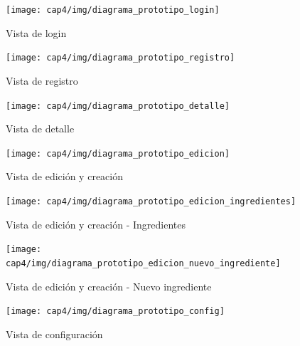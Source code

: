 \begin{figure}[hp]
  \centering
  \texttt{[image: cap4/img/diagrama\_prototipo\_login]}
  \caption{Vista de login}
  \label{fig:diagrama-prototipo-login}
\end{figure}

\begin{figure}[hp]
  \centering
  \texttt{[image: cap4/img/diagrama\_prototipo\_registro]}
  \caption{Vista de registro}
  \label{fig:diagrama-prototipo-registro}
\end{figure}

\begin{figure}[hp]
  \centering
  \texttt{[image: cap4/img/diagrama\_prototipo\_detalle]}
  \caption{Vista de detalle}
  \label{fig:diagrama-prototipo-detalle}
\end{figure}

\begin{figure}[hp]
  \centering
  \texttt{[image: cap4/img/diagrama\_prototipo\_edicion]}
  \caption{Vista de edición y creación}
  \label{fig:diagrama-prototipo-edicion}
\end{figure}

\begin{figure}[hp]
  \centering
  \texttt{[image: cap4/img/diagrama\_prototipo\_edicion\_ingredientes]}
  \caption{Vista de edición y creación - Ingredientes}
  \label{fig:diagrama-prototipo-edicion-ingredientes}
\end{figure}

\begin{figure}[hp]
  \centering
  \texttt{[image: cap4/img/diagrama\_prototipo\_edicion\_nuevo\_ingrediente]}
  \caption{Vista de edición y creación - Nuevo ingrediente}
  \label{fig:diagrama-prototipo-edicion-nuevo-ingrediente}
\end{figure}

\begin{figure}[hp]
  \centering
  \texttt{[image: cap4/img/diagrama\_prototipo\_config]}
  \caption{Vista de configuración}
  \label{fig:diagrama-prototipo-config}
\end{figure}
